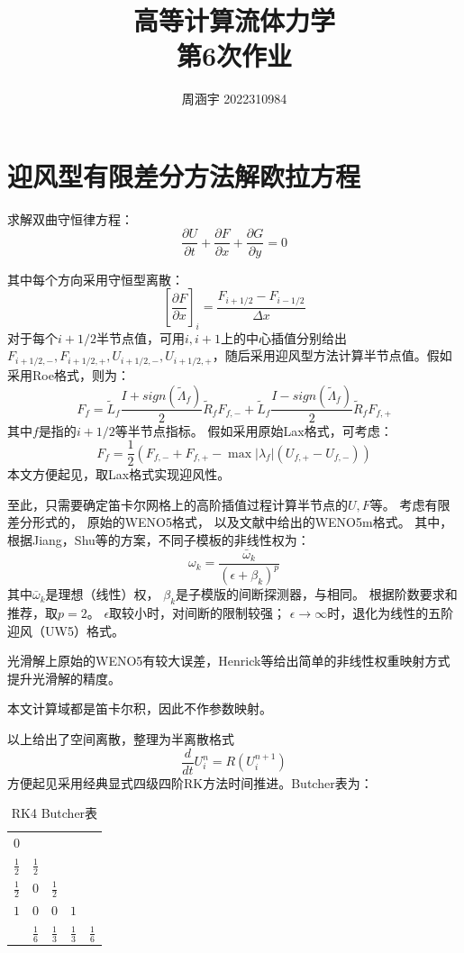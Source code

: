 \documentclass[UTF8,zihao=5]{ctexart} %
\title{{\bfseries\rmfamily\Huge{高等计算流体力学\hspace{1em}\\第6次作业}}}
\author{周涵宇 2022310984}
\date{}
\newcommand*{\pd}[2]{\frac{\partial #1}{\partial #2}}
\newcommand*{\inc}[0]{{\Delta}}
\begin{document}
\maketitle

\section{迎风型有限差分方法解欧拉方程}

求解双曲守恒律方程：
\begin{equation}
    \pd{U}{t}+\pd{F}{x}+\pd{G}{y}=0
\end{equation}

其中每个方向采用守恒型离散：
$$
    \left[\pd{F}{x}\right]_i =
    \frac{F_{i+1/2}-F_{i-1/2}}{\inc x}
$$
对于每个$i+1/2$半节点值，可用$i,i+1$上的中心插值分别给出
$F_{i+1/2,-},F_{i+1/2,+},U_{i+1/2,-},U_{i+1/2,+}$，随后采用迎风型方法计算半节点值。假如采用Roe格式，则为：
$$
    F_{f}=\tilde{L}_f\frac{I+sign(\tilde{\Lambda}_f)}{2}\tilde{R}_fF_{f,-}+\tilde{L}_f\frac{I-sign(\tilde{\Lambda}_f)}{2}\tilde{R}_fF_{f,+}
$$
其中$f$是指的$i+1/2$等半节点指标。
假如采用原始Lax格式，可考虑：
$$
    F_{f}=\frac{1}{2}(F_{f,-}+F_{f,+}-\max|\lambda_f|(U_{f,+}-U_{f,-}))
$$
本文方便起见，取Lax格式实现迎风性。

至此，只需要确定笛卡尔网格上的高阶插值过程计算半节点的$U,F$等。
考虑有限差分形式的，
原始的WENO5格式\cite{jiang1996efficient}，
以及文献\cite{henrick2005mapped}中给出的WENO5m格式。
其中，根据Jiang，Shu等的方案\cite{jiang1996efficient}，不同子模板的非线性权为：
$$
    \omega_k=\frac{\bar\omega_k}{(\epsilon+\beta_k)^{p}}
$$
其中$\bar\omega_k$是理想（线性）权，
$\beta_k$是子模版的间断探测器，与\cite{jiang1996efficient}相同。
根据阶数要求和推荐，取$p=2$。
$\epsilon$取较小时，对间断的限制较强；
$\epsilon\rightarrow\infty$时，退化为线性的五阶迎风（UW5）格式。

光滑解上原始的WENO5有较大误差，Henrick等给出简单的非线性权重映射方式提升光滑解的精度\cite{henrick2005mapped}。

本文计算域都是笛卡尔积，因此不作参数映射。

以上给出了空间离散，整理为半离散格式
$$
    \frac{d}{dt}U_i^n=R(U_i^{n+1})
$$
方便起见采用经典显式四级四阶RK方法时间推进。Butcher表为：
\begin{table}[H]
    \footnotesize
    \begin{center}
        \caption{RK4 Butcher表} %
        \begin{tabular}{c|cccc}
            $0$                                                                           \\
            $\frac{1}{2}$ & $\frac{1}{2}$                                                 \\
            $\frac{1}{2}$ & $0$           & $\frac{1}{2}$                                 \\
            $1$           & $0$           & $0$           & $1$                           \\
            \hline
                          & $\frac{1}{6}$ & $\frac{1}{3}$ & $\frac{1}{3}$ & $\frac{1}{6}$
        \end{tabular}
    \end{center}
\end{table}
\end{document}
